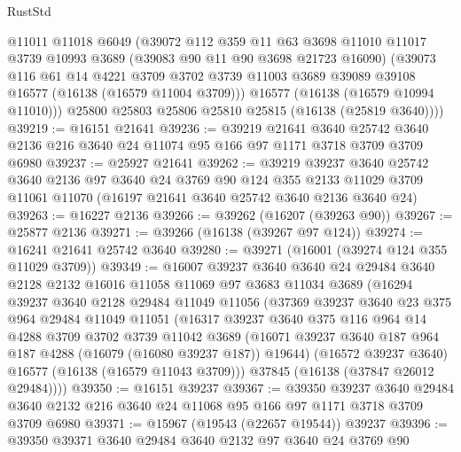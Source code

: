 \begin{lexlean}{RustStd}
\begin{coremodule}
        @11011
        @11018
        @6049
        (@39072
          @112
          @359
          @11
          @63
          @3698
          @11010
          @11017
          @3739
          @10993
          @3689
          (@39083 @90 @11 @90 @3698 @21723 @16090)
          (@39073
            @116
            @61
            @14
            @4221
            @3709
            @3702
            @3739
            @11003
            @3689
            @39089
            @39108
            @16577
            (@16138 (@16579 @11004 @3709)))
          @16577
          (@16138 (@16579 @10994 @11010)))
        @25800
        @25803
        @25806
        @25810
        @25815
        (@16138 (@25819 @3640))))
@39219 := @16151 @21641
@39236 := @39219
    @21641
    @3640
    @25742
    @3640
    @2136
    @216
    @3640
    @24
    @11074
    @95
    @166
    @97
    @1171
    @3718
    @3709
    @3709
    @6980
@39237 := @25927 @21641
@39262 := @39219
    @39237
    @3640
    @25742
    @3640
    @2136
    @97
    @3640
    @24
    @3769
    @90
    @124
    @355
    @2133
    @11029
    @3709
    @11061
    @11070
    (@16197 @21641 @3640 @25742 @3640 @2136 @3640 @24)
@39263 := @16227 @2136
@39266 := @39262 (@16207 (@39263 @90))
@39267 := @25877 @2136
@39271 := @39266 (@16138 (@39267 @97 @124))
@39274 := @16241 @21641 @25742 @3640
@39280 := @39271 (@16001 (@39274 @124 @355 @11029 @3709))
@39349 := @16007
    @39237
    @3640
    @3640
    @24
    @29484
    @3640
    @2128
    @2132
    @16016
    @11058
    @11069
    @97
    @3683
    @11034
    @3689
    (@16294
      @39237
      @3640
      @2128
      @29484
      @11049
      @11056
      (@37369
        @39237
        @3640
        @23
        @375
        @964
        @29484
        @11049
        @11051
        (@16317
          @39237
          @3640
          @375
          @116
          @964
          @14
          @4288
          @3709
          @3702
          @3739
          @11042
          @3689
          (@16071 @39237 @3640 @187 @964 @187 @4288 (@16079 (@16080 @39237 @187)) @19644)
          (@16572 @39237 @3640)
          @16577
          (@16138 (@16579 @11043 @3709)))
        @37845
        (@16138 (@37847 @26012 @29484))))
@39350 := @16151 @39237
@39367 := @39350
    @39237
    @3640
    @29484
    @3640
    @2132
    @216
    @3640
    @24
    @11068
    @95
    @166
    @97
    @1171
    @3718
    @3709
    @3709
    @6980
@39371 := @15967 (@19543 (@22657 @19544)) @39237
@39396 := @39350
    @39371
    @3640
    @29484
    @3640
    @2132
    @97
    @3640
    @24
    @3769
    @90

\end{coremodule}
\end{lexlean}
